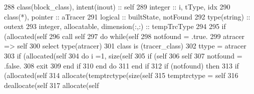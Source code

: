 \begin{DoxyCode}
288     \textcolor{keywordtype}{class}(block\_class), \textcolor{keywordtype}{intent(inout)} :: self    
289     \textcolor{keywordtype}{integer} :: i, tType, idx
290     \textcolor{keywordtype}{class}(*), \textcolor{keywordtype}{pointer} :: aTracer
291     \textcolor{keywordtype}{logical} :: builtState, notFound
292     \textcolor{keywordtype}{type}(string) :: outext
293     \textcolor{keywordtype}{integer}, \textcolor{keywordtype}{allocatable}, \textcolor{keywordtype}{dimension(:,:)} :: tempTrcType
294     
295     \textcolor{keywordflow}{if} (\textcolor{keyword}{allocated}(self%
296     \textcolor{keyword}{call }self%
297     \textcolor{keywordflow}{do} \textcolor{keywordflow}{while}(self%
298         notfound = .true.
299         atracer => self%
300         \textcolor{keywordflow}{select type}(atracer)
301 \textcolor{keywordflow}{        class is} (tracer\_class)
302                 ttype = atracer%
303                 \textcolor{keywordflow}{if} (\textcolor{keyword}{allocated}(self%
304                     \textcolor{keywordflow}{do} i =1, \textcolor{keyword}{size}(self%
305                         \textcolor{keywordflow}{if} (self%
306                             self%
307                             notfound = .false.
308                             \textcolor{keywordflow}{exit}
309 \textcolor{keywordflow}{                        end if}
310 \textcolor{keywordflow}{                    end do}
311 \textcolor{keywordflow}{                end if}
312                 \textcolor{keywordflow}{if} (notfound) \textcolor{keywordflow}{then}
313                     \textcolor{keywordflow}{if} (\textcolor{keyword}{allocated}(self%
314                         \textcolor{keyword}{allocate}(temptrctype(\textcolor{keyword}{size}(self%
315                         temptrctype = self%
316                         \textcolor{keyword}{deallocate}(self%
317                         \textcolor{keyword}{allocate}(self%

\end{DoxyCode}
